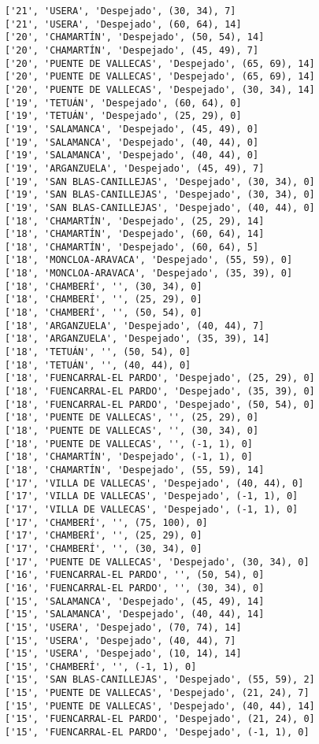 \documentclass[11pt]{article}
\begin{document}
\begin{Verbatim}[commandchars=\\\{\}]
['21', 'USERA', 'Despejado', (30, 34), 7]
['21', 'USERA', 'Despejado', (60, 64), 14]
['20', 'CHAMARTÍN', 'Despejado', (50, 54), 14]
['20', 'CHAMARTÍN', 'Despejado', (45, 49), 7]
['20', 'PUENTE DE VALLECAS', 'Despejado', (65, 69), 14]
['20', 'PUENTE DE VALLECAS', 'Despejado', (65, 69), 14]
['20', 'PUENTE DE VALLECAS', 'Despejado', (30, 34), 14]
['19', 'TETUÁN', 'Despejado', (60, 64), 0]
['19', 'TETUÁN', 'Despejado', (25, 29), 0]
['19', 'SALAMANCA', 'Despejado', (45, 49), 0]
['19', 'SALAMANCA', 'Despejado', (40, 44), 0]
['19', 'SALAMANCA', 'Despejado', (40, 44), 0]
['19', 'ARGANZUELA', 'Despejado', (45, 49), 7]
['19', 'SAN BLAS-CANILLEJAS', 'Despejado', (30, 34), 0]
['19', 'SAN BLAS-CANILLEJAS', 'Despejado', (30, 34), 0]
['19', 'SAN BLAS-CANILLEJAS', 'Despejado', (40, 44), 0]
['18', 'CHAMARTÍN', 'Despejado', (25, 29), 14]
['18', 'CHAMARTÍN', 'Despejado', (60, 64), 14]
['18', 'CHAMARTÍN', 'Despejado', (60, 64), 5]
['18', 'MONCLOA-ARAVACA', 'Despejado', (55, 59), 0]
['18', 'MONCLOA-ARAVACA', 'Despejado', (35, 39), 0]
['18', 'CHAMBERÍ', '', (30, 34), 0]
['18', 'CHAMBERÍ', '', (25, 29), 0]
['18', 'CHAMBERÍ', '', (50, 54), 0]
['18', 'ARGANZUELA', 'Despejado', (40, 44), 7]
['18', 'ARGANZUELA', 'Despejado', (35, 39), 14]
['18', 'TETUÁN', '', (50, 54), 0]
['18', 'TETUÁN', '', (40, 44), 0]
['18', 'FUENCARRAL-EL PARDO', 'Despejado', (25, 29), 0]
['18', 'FUENCARRAL-EL PARDO', 'Despejado', (35, 39), 0]
['18', 'FUENCARRAL-EL PARDO', 'Despejado', (50, 54), 0]
['18', 'PUENTE DE VALLECAS', '', (25, 29), 0]
['18', 'PUENTE DE VALLECAS', '', (30, 34), 0]
['18', 'PUENTE DE VALLECAS', '', (-1, 1), 0]
['18', 'CHAMARTÍN', 'Despejado', (-1, 1), 0]
['18', 'CHAMARTÍN', 'Despejado', (55, 59), 14]
['17', 'VILLA DE VALLECAS', 'Despejado', (40, 44), 0]
['17', 'VILLA DE VALLECAS', 'Despejado', (-1, 1), 0]
['17', 'VILLA DE VALLECAS', 'Despejado', (-1, 1), 0]
['17', 'CHAMBERÍ', '', (75, 100), 0]
['17', 'CHAMBERÍ', '', (25, 29), 0]
['17', 'CHAMBERÍ', '', (30, 34), 0]
['17', 'PUENTE DE VALLECAS', 'Despejado', (30, 34), 0]
['16', 'FUENCARRAL-EL PARDO', '', (50, 54), 0]
['16', 'FUENCARRAL-EL PARDO', '', (30, 34), 0]
['15', 'SALAMANCA', 'Despejado', (45, 49), 14]
['15', 'SALAMANCA', 'Despejado', (40, 44), 14]
['15', 'USERA', 'Despejado', (70, 74), 14]
['15', 'USERA', 'Despejado', (40, 44), 7]
['15', 'USERA', 'Despejado', (10, 14), 14]
['15', 'CHAMBERÍ', '', (-1, 1), 0]
['15', 'SAN BLAS-CANILLEJAS', 'Despejado', (55, 59), 2]
['15', 'PUENTE DE VALLECAS', 'Despejado', (21, 24), 7]
['15', 'PUENTE DE VALLECAS', 'Despejado', (40, 44), 14]
['15', 'FUENCARRAL-EL PARDO', 'Despejado', (21, 24), 0]
['15', 'FUENCARRAL-EL PARDO', 'Despejado', (-1, 1), 0]

\end{Verbatim}
\end{document}
